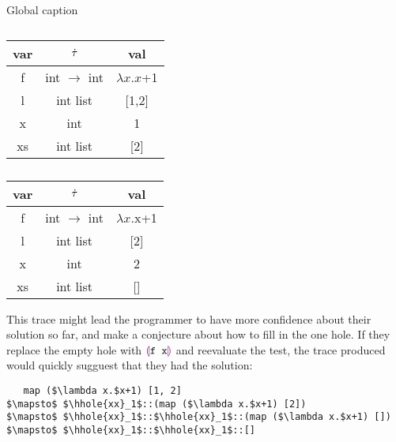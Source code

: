 \begin{table}
  \label{tabx}
  \caption{Global caption}
  \begin{subtable}{.6\linewidth}
      \centering
      \caption{}
          \begin{tabular}{c|c|c}
      var & $\dot{\tau}$ & val\\
      \hline
      f & int $\to$ int & $\lambda x.x$+1\\
      l & int list & [1,2]\\
      x & int & 1\\
      xs & int list & [2]\\
    \end{tabular}
    \end{subtable}%
    \begin{subtable}{.6\linewidth}
      \centering
      \caption{}
    \begin{tabular}{c|c|c}
      var & $\dot{\tau}$ & val\\
      \hline
      f & int $\to$ int & $\lambda x.$x+1\\
      l & int list & [2]\\
      x & int & 2\\
      xs & int list & []\\
    \end{tabular}
    \end{subtable}
\end{table}

This trace might lead the programmer to have more confidence about their
solution so far, and make a conjecture about how to fill in the one
hole. If they replace the empty hole with $\textcolor{violet}{\llparenthesis}\texttt{f x}\textcolor{violet}{\rrparenthesis}$ and
reevaluate the test, the trace produced would quickly sugguest that they
had the solution:
\begin{lstlisting}
   map ($\lambda x.$x+1) [1, 2]
$\mapsto$ $\hhole{xx}_1$::(map ($\lambda x.$x+1) [2])
$\mapsto$ $\hhole{xx}_1$::$\hhole{xx}_1$::(map ($\lambda x.$x+1) [])
$\mapsto$ $\hhole{xx}_1$::$\hhole{xx}_1$::[]
\end{lstlisting}
